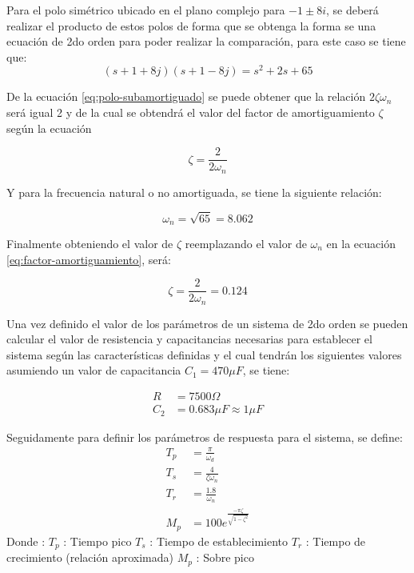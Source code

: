\documentclass[conference]{IEEEtran}
\begin{document}
	Para el polo simétrico ubicado en el plano complejo para $-1 \pm 8i$, se deberá realizar el producto de estos polos de forma que se obtenga la forma se una ecuación de 2do orden para poder realizar la comparación, para este caso se tiene que:
	\begin{equation}
		(s + 1 + 8j)(s + 1 - 8j) = s^2 + 2s + 65
		\label{eq:polo-subamortiguado}
	\end{equation}
	
	De la ecuación \ref{eq:polo-subamortiguado} se puede obtener que la relación $2\zeta \omega_n$ será igual 2 y de la cual se obtendrá el valor del factor de amortiguamiento $\zeta$ según la ecuación
	
	\begin{equation}
		\zeta = \frac{2}{2 \omega_n}
		\label{eq:factor-amortiguamiento}
	\end{equation}
	
	Y para la frecuencia natural o no amortiguada, se tiene la siguiente relación:
	
	\begin{equation}
		\omega_n = \sqrt{65} = 8.062
		\label{eq:frecuencia-natural}
	\end{equation}
	
	Finalmente obteniendo el valor de $\zeta$ reemplazando el valor de $\omega_n$ en la ecuación \ref{eq:factor-amortiguamiento}, será:
	
	\begin{equation}
		\zeta = \frac{2}{ 2 \omega_n} = 0.124
	\end{equation}
	
	Una vez definido el valor de los parámetros de un sistema de 2do orden se pueden calcular el valor de resistencia y capacitancias necesarias para establecer el sistema según las características definidas y el cual tendrán los siguientes valores asumiendo un valor de capacitancia $C_1 = 470\mu F \label{eq:sub-capacitancia-c1}$, se tiene: 
	
	\begin{align}
		R &=  7500\Omega \label{eq:sub-resistencia}\\
		C_2 &= 0.683 \mu F \approx 1 \mu F \label{eq:sub-capacitancia-c2}
	\end{align}
	
	Seguidamente para definir los parámetros de respuesta para el sistema, se define: \\
	
	\begin{align}
		T_p &= \frac{\pi}{\omega_d} \\
		T_s &= \frac{4}{\zeta \omega_n} \\
		T_r &= \frac{1.8}{\omega_n} \\
		M_p &= 100e^{ \frac{-\pi \zeta}{ \sqrt{1 - \zeta^2}} }
	\end{align}
	Donde :
	$T_p$ : Tiempo pico 
	$T_s$ : Tiempo de establecimiento 
	$T_r$ : Tiempo de crecimiento (relación aproximada)
	$M_p$ : Sobre pico
	
\end{document}
